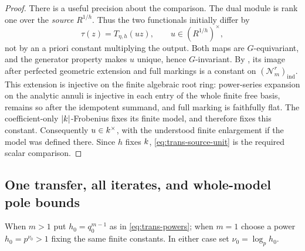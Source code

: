 \begin{proof}
There is a useful precision about the comparison.  The dual module is
rank one over the \emph{source} $R^{1/h}$.  Thus the two functionals
initially differ by
\begin{equation}
 \tau(z)=T_{\eta,h}(u z),\qquad u\in(R^{1/h})^\times,
 \label{eq:trans-source-unit}
\end{equation}
not by an a priori constant multiplying the output.  Both maps are
$G$-equivariant, and the generator property makes $u$ unique, hence
$G$-invariant.  By , its
image after perfected geometric extension and full markings is a
constant on $(\mathcal N_m^r)_{\mathrm{ind}}$.  This extension is
injective on the finite algebraic root ring: power-series expansion
on the analytic annuli is injective in each entry of the whole finite
free basis, remains so after the idempotent summand, and full marking
is faithfully flat.  The coefficient-only
$|k|$-Frobenius fixes its finite model, and therefore fixes this
constant.  Consequently $u\in k^\times$, with the understood finite
enlargement if the model was defined there.  Since $h$ fixes $k$,
\cref{eq:trans-source-unit} is the required scalar comparison.
\end{proof}

\subsection{One transfer, all iterates, and whole-model pole bounds}

When $m>1$ put $h_0=q_0^{m-1}$ as in
\cref{eq:trans-powers}; when $m=1$ choose a power $h_0=p^{\nu_0}>1$
fixing the same finite constants.  In either case set
$\nu_0=\log_p h_0$.

